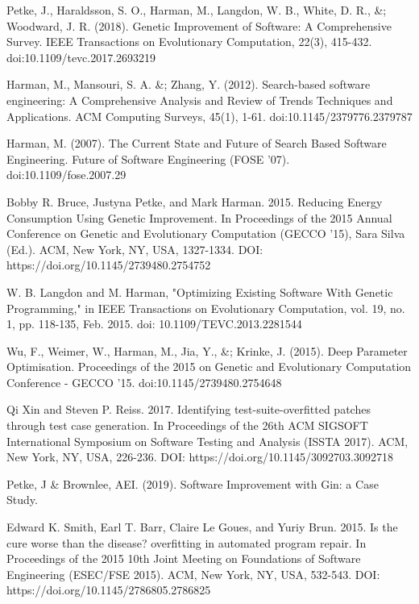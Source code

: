 \documentclass[titlepage]{article}
\begin{document}
\appendix

\begin{thebibliography}{99}

Petke, J., Haraldsson, S. O., Harman, M., Langdon, W. B., White, D. R., \&; Woodward, J. R. (2018). Genetic Improvement of Software: A Comprehensive Survey. IEEE Transactions on Evolutionary Computation, 22(3), 415-432. doi:10.1109/tevc.2017.2693219

Harman, M., Mansouri, S. A. \&; Zhang, Y. (2012). Search-based software engineering: A Comprehensive Analysis and Review of Trends Techniques and Applications. ACM Computing Surveys, 45(1), 1-61. doi:10.1145/2379776.2379787

Harman, M. (2007). The Current State and Future of Search Based Software Engineering. Future of Software Engineering (FOSE '07). doi:10.1109/fose.2007.29

Bobby R. Bruce, Justyna Petke, and Mark Harman. 2015. Reducing Energy Consumption Using Genetic Improvement. In Proceedings of the 2015 Annual Conference on Genetic and Evolutionary Computation (GECCO '15), Sara Silva (Ed.). ACM, New York, NY, USA, 1327-1334. DOI: https://doi.org/10.1145/2739480.2754752

W. B. Langdon and M. Harman, "Optimizing Existing Software With Genetic Programming," in IEEE Transactions on Evolutionary Computation, vol. 19, no. 1, pp. 118-135, Feb. 2015. doi: 10.1109/TEVC.2013.2281544

Wu, F., Weimer, W., Harman, M., Jia, Y., \&; Krinke, J. (2015). Deep Parameter Optimisation. Proceedings of the 2015 on Genetic and Evolutionary Computation Conference - GECCO '15. doi:10.1145/2739480.2754648

Qi Xin and Steven P. Reiss. 2017. Identifying test-suite-overfitted patches through test case generation. In Proceedings of the 26th ACM SIGSOFT International Symposium on Software Testing and Analysis (ISSTA 2017). ACM, New York, NY, USA, 226-236. DOI: https://doi.org/10.1145/3092703.3092718

Petke, J \& Brownlee, AEI. (2019). Software Improvement with Gin: a Case Study.

Edward K. Smith, Earl T. Barr, Claire Le Goues, and Yuriy Brun. 2015. Is the cure worse than the disease? overfitting in automated program repair. In Proceedings of the 2015 10th Joint Meeting on Foundations of Software Engineering (ESEC/FSE 2015). ACM, New York, NY, USA, 532-543. DOI: https://doi.org/10.1145/2786805.2786825


\end{thebibliography}
\end{document}
